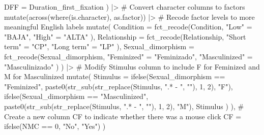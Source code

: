 \documentclass[
  bookmarksnumbered]{article}
\newenvironment{Shaded}{\begin{snugshade}}{\end{snugshade}}
\newcommand{\AttributeTok}[1]{\textcolor[rgb]{0.80,0.80,0.80}{#1}}
\newcommand{\CommentTok}[1]{\textcolor[rgb]{0.50,0.62,0.50}{#1}}
\newcommand{\DecValTok}[1]{\textcolor[rgb]{0.86,0.86,0.80}{#1}}
\newcommand{\FunctionTok}[1]{\textcolor[rgb]{0.94,0.94,0.56}{#1}}
\newcommand{\NormalTok}[1]{\textcolor[rgb]{0.80,0.80,0.80}{#1}}
\newcommand{\OtherTok}[1]{\textcolor[rgb]{0.94,0.94,0.56}{#1}}
\newcommand{\SpecialCharTok}[1]{\textcolor[rgb]{0.86,0.64,0.64}{#1}}
\newcommand{\StringTok}[1]{\textcolor[rgb]{0.80,0.58,0.58}{#1}}
\begin{document}
\begin{Shaded}
\begin{Highlighting}[]
    \AttributeTok{DFF =}\NormalTok{ Duration\_first\_fixation}
\NormalTok{  ) }\SpecialCharTok{|\textgreater{}}
  \CommentTok{\# Convert character columns to factors}
  \FunctionTok{mutate}\NormalTok{(}\FunctionTok{across}\NormalTok{(}\FunctionTok{where}\NormalTok{(is.character), as.factor)) }\SpecialCharTok{|\textgreater{}}
  \CommentTok{\# Recode factor levels to more meaningful English labels}
  \FunctionTok{mutate}\NormalTok{(}
    \AttributeTok{Condition =} \FunctionTok{fct\_recode}\NormalTok{(Condition,}
                           \StringTok{"Low"} \OtherTok{=} \StringTok{"BAJA"}\NormalTok{,}
                           \StringTok{"High"} \OtherTok{=} \StringTok{"ALTA"}
\NormalTok{    ),}
    \AttributeTok{Relationship =} \FunctionTok{fct\_recode}\NormalTok{(Relationship,}
                              \StringTok{"Short term"} \OtherTok{=} \StringTok{"CP"}\NormalTok{,}
                              \StringTok{"Long term"} \OtherTok{=} \StringTok{"LP"}
\NormalTok{    ),}
    \AttributeTok{Sexual\_dimorphism =} \FunctionTok{fct\_recode}\NormalTok{(Sexual\_dimorphism,}
                                   \StringTok{"Feminized"} \OtherTok{=} \StringTok{"Feminizado"}\NormalTok{,}
                                   \StringTok{"Masculinized"} \OtherTok{=} \StringTok{"Masculinizado"}
\NormalTok{    )}
\NormalTok{  ) }\SpecialCharTok{|\textgreater{}}
  \CommentTok{\# Modify \textquotesingle{}Stimulus\textquotesingle{} column to include \textquotesingle{}F\textquotesingle{} for Feminized and \textquotesingle{}M\textquotesingle{} for Masculinized}
  \FunctionTok{mutate}\NormalTok{(}
    \AttributeTok{Stimulus =} \FunctionTok{ifelse}\NormalTok{(Sexual\_dimorphism }\SpecialCharTok{==} \StringTok{"Feminized"}\NormalTok{,}
                      \FunctionTok{paste0}\NormalTok{(}\FunctionTok{str\_sub}\NormalTok{(}\FunctionTok{str\_replace}\NormalTok{(Stimulus, }\StringTok{".* {-} "}\NormalTok{, }\StringTok{""}\NormalTok{), }\DecValTok{1}\NormalTok{, }\DecValTok{2}\NormalTok{), }\StringTok{"F"}\NormalTok{),}
                      \FunctionTok{ifelse}\NormalTok{(Sexual\_dimorphism }\SpecialCharTok{==} \StringTok{"Masculinized"}\NormalTok{,}
                             \FunctionTok{paste0}\NormalTok{(}\FunctionTok{str\_sub}\NormalTok{(}\FunctionTok{str\_replace}\NormalTok{(Stimulus, }\StringTok{".* {-} "}\NormalTok{, }\StringTok{""}\NormalTok{), }\DecValTok{1}\NormalTok{, }\DecValTok{2}\NormalTok{), }\StringTok{"M"}\NormalTok{),}
\NormalTok{                             Stimulus}
\NormalTok{                      )}
\NormalTok{    ),}
    \CommentTok{\# Create a new column \textquotesingle{}CF\textquotesingle{} to indicate whether there was a mouse click}
    \AttributeTok{CF =} \FunctionTok{ifelse}\NormalTok{(NMC }\SpecialCharTok{==} \DecValTok{0}\NormalTok{, }\StringTok{"No"}\NormalTok{, }\StringTok{"Yes"}\NormalTok{)}
\NormalTok{  )}
\end{Highlighting}
\end{Shaded}
\end{document}
